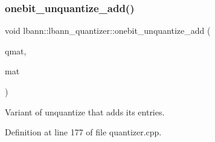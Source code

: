 \subsubsection{\texorpdfstring{onebit\+\_\+unquantize\+\_\+add()}{onebit\_unquantize\_add()}}
{\footnotesize\ttfamily void lbann\+::lbann\+\_\+quantizer\+::onebit\+\_\+unquantize\+\_\+add (\begin{DoxyParamCaption}\item[{const \hyperlink{classlbann_1_1lbann__quantizer_a399f3f8c393b6021b43e95d1ce6ea28c}{Quantized\+Matrix} \&}]{qmat,  }\item[{\hyperlink{base_8hpp_a68f11fdc31b62516cb310831bbe54d73}{Mat} \&}]{mat }\end{DoxyParamCaption})\hspace{0.3cm}{\ttfamily [private]}}

Variant of unquantize that adds its entries. 

Definition at line 177 of file quantizer.\+cpp.


